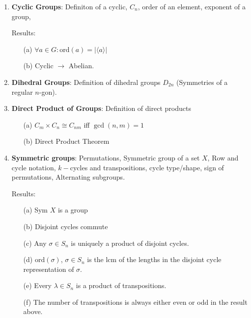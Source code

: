 \documentclass{article}
\begin{document}
\begin{enumerate}
	\item \textbf{Cyclic Groups}: Definiton of a cyclic, $C_{n}$, order of an element, exponent of a group, 
	
	Results:
	\begin{enumerate}
		\item [(a)] $\forall a \in G: \text{ord}(a) = \lvert \langle a \rangle \rvert$ 

		\item [(b)] Cyclic $\rightarrow$ Abelian.
	\end{enumerate}
	
	\item \textbf{Dihedral Groups}: Definition of dihedral groups $D_{2n}$ (Symmetries of a regular $n$-gon).

	\item \textbf{Direct Product of Groups}: Definition of direct products

	\begin{enumerate}
		\item [(a)] $C_{m} \times C_{n} \cong C_{nm}$ iff $\gcd(n,m) = 1$

		\item [(b)] Direct Product Theorem
	\end{enumerate}

	\item \textbf{Symmetric groups}: Permutations, Symmetric group of a set $X$, Row and cycle notation, $k-$cycles and transpositions, cycle type/shape, sign of permutations, Alternating subgroups.

	Results:
	\begin{enumerate}
		\item [(a)] Sym $X$ is a group

		\item [(b)] Disjoint cycles commute

		\item [(c)] Any $\sigma \in S_{n}$ is uniquely a product of disjoint cycles.

		\item [(d)] $\text{ord}(\sigma)$, $\sigma \in S_{n}$ is the lcm of the lengths in the disjoint cycle representation of $\sigma$.

		\item [(e)] Every $\lambda \in S_{n}$ is a product of transpositions.

		\item [(f)] The number of transpositions is always either even or odd in the result above.


\end{enumerate}
\end{enumerate}
\end{document}
